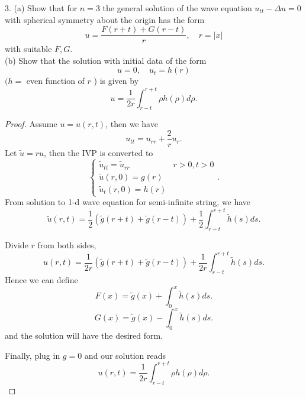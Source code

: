 \begin{problem}
	3. (a) Show that for $n=3$ the general solution of the wave equation $u_{t t}-\Delta u=0$ with spherical symmetry about the origin has the form
\[
u=\frac{F(r+t)+G(r-t)}{r}, \quad r=|x|
\]
with suitable $F, G$.\\
(b) Show that the solution with initial data of the form
\[
u=0, \quad u_t=h(r)
\]
$(h=$ even function of $r$ ) is given by
\[
u=\frac{1}{2 r} \int_{r-t}^{r+t} \rho h(\rho) d \rho .
\]
\end{problem}
\begin{proof}
	Assume $u = u(r, t)$, then we have
	\[
		u_{tt} = u_{r r} + \frac{2}{r} u_r
	.\] 
	Let $\tilde u = r u$, then the IVP is converted to
	\[
		\begin{cases}
			\tilde u_{t t} = \tilde u_{r r} & r > 0, t > 0 \\
			\tilde u(r, 0) = g(r) \\
			\tilde u_t(r, 0) = h(r)
		\end{cases}
	.\] 
	From solution to 1-d wave equation for semi-infinite string, we have
	\[
		\tilde u(r, t)
		= \frac{1}{2}\left( \tilde g(r + t) + \tilde g(r - t) \right)  + \frac{1}{2} \int _{r - t}^{r + t} \tilde h (s) ds
	.\] 

	Divide $r$ from both sides,
\[
		u(r, t)
		= \frac{1}{2 r}\left( \tilde g(r + t) + \tilde g(r - t) \right)  + \frac{1}{2r} \int _{r - t}^{r + t} \tilde h (s) ds
	.\]
	Hence we can define
	\[
		F(x) = \tilde g(x) + \int _0^x \tilde h(s) ds 
	.\] 
 	\[
		G(x) = \tilde g(x) - \int _0^x \tilde h(s) ds 
	.\]
	and the solution will have the desired form.


	Finally, plug in $g = 0$  and our solution reads
	\[
		u(r, t) = \frac{1}{2 r} \int _{r - t}^{r + t} \rho h(\rho) d \rho
	.\] 
\end{proof}


